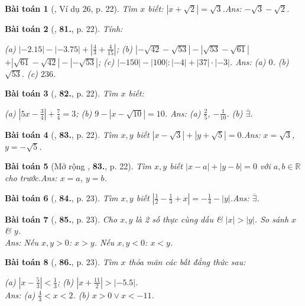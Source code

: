 \documentclass{article}
\newtheorem{baitoan}{Bài toán}
\begin{document}
\begin{baitoan}[\cite{Tuyen_Toan_7}, Ví dụ 26, p. 22]
	Tìm $x$ biết: $|x + \sqrt{2}| = \sqrt{3}$.\hfill{\sf Ans:} $-\sqrt{3} - \sqrt{2}$.
\end{baitoan}

\begin{baitoan}[\cite{Tuyen_Toan_7}, \textbf{81.}, p. 22]
	Tính:
	
		(a) $|-2.15| - |-3.75| + \left|\frac{4}{3} + \frac{4}{15}\right|$;
		(b) $|-\sqrt{42} - \sqrt{53}| - |\sqrt{53} - \sqrt{61}|$\\$+ |\sqrt{61} - \sqrt{42}| - |-\sqrt{53}|$;
		(c) $|-150| - |100|:|-4| + |37|\cdot|-3|$.
	\hfill{\sf Ans:} (a) $0$. (b) $\sqrt{53}$. (c) $236$.
\end{baitoan}

\begin{baitoan}[\cite{Tuyen_Toan_7}, \textbf{82.}, p. 22]
	Tìm $x$ biết:
	
		(a) $\left|5x - \frac{3}{4}\right| + \frac{7}{4} = 3$;
		(b) $9 - |x - \sqrt{10}| = 10$.
	\hfill{\sf Ans:} (a) $\frac{2}{5}$, $-\frac{1}{10}$. (b) $\overline{\exists}$.
\end{baitoan}

\begin{baitoan}[\cite{Tuyen_Toan_7}, \textbf{83.}, p. 22]
	Tìm $x,y$ biết $|x - \sqrt{3}| + |y + \sqrt{5}| = 0$.\hfill{\sf Ans:} $x = \sqrt{3}$, $y = -\sqrt{5}$.
\end{baitoan}

\begin{baitoan}[Mở rộng \cite{Tuyen_Toan_7}, \textbf{83.}, p. 22]
	Tìm $x,y$ biết $|x - a| + |y - b| = 0$ với $a,b\in\mathbb{R}$ cho trước.\hfill{\sf Ans:} $x = a$, $y = b$.
\end{baitoan}

\begin{baitoan}[\cite{Tuyen_Toan_7}, \textbf{84.}, p. 23]
	Tìm $x,y$ biết $\left|\frac{1}{2} - \frac{1}{3} + x\right| = -\frac{1}{4} - |y|$.\hfill{\sf Ans:} $\overline{\exists}$.
\end{baitoan}

\begin{baitoan}[\cite{Tuyen_Toan_7}, \textbf{85.}, p. 23]
	Cho $x,y$ là 2 số thực cùng dấu \& $|x| > |y|$. So sánh $x$ \& $y$.\\\mbox{}\hfill{\sf Ans:} Nếu $x,y > 0$: $x > y$. Nếu $x,y < 0$: $x < y$.
\end{baitoan}

\begin{baitoan}[\cite{Tuyen_Toan_7}, \textbf{86.}, p. 23]
	Tìm $x$ thỏa mãn các bất đẳng thức sau:
	
		(a) $\left|x - \frac{5}{3}\right| < \frac{1}{3}$;
		(b) $\left|x + \frac{11}{2}\right| > |-5.5|$.
	\\\mbox{}\hfill{\sf Ans:} (a) $\frac{4}{3} < x < 2$. (b) $x > 0\lor x < -11$.
\end{baitoan}
\end{document}
